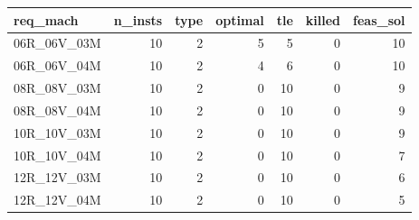 
\begin{tabular}{lrrrrrr}
\toprule
req\_mach & n\_insts & type & optimal & tle & killed & feas\_sol\\
\midrule
06R\_06V\_03M & 10 & 2 & 5 & 5 & 0 & 10\\
06R\_06V\_04M & 10 & 2 & 4 & 6 & 0 & 10\\
08R\_08V\_03M & 10 & 2 & 0 & 10 & 0 & 9\\
08R\_08V\_04M & 10 & 2 & 0 & 10 & 0 & 9\\
10R\_10V\_03M & 10 & 2 & 0 & 10 & 0 & 9\\
\addlinespace
10R\_10V\_04M & 10 & 2 & 0 & 10 & 0 & 7\\
12R\_12V\_03M & 10 & 2 & 0 & 10 & 0 & 6\\
12R\_12V\_04M & 10 & 2 & 0 & 10 & 0 & 5\\
\bottomrule
\end{tabular}
